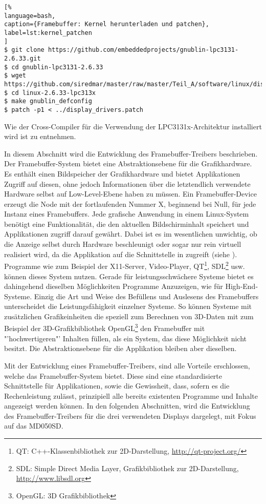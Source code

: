 \begin{lstlisting}[%
language=bash,
caption={Framebuffer: Kernel herunterladen und patchen},
label=lst:kernel_patchen
]
$ git clone https://github.com/embeddedprojects/gnublin-lpc3131-2.6.33.git
$ cd gnublin-lpc3131-2.6.33
$ wget https://github.com/siredmar/master/raw/master/Teil_A/software/linux/display_drivers.patch
$ cd linux-2.6.33-lpc313x
$ make gnublin_defconfig
$ patch -p1 < ../display_drivers.patch
\end{lstlisting}
Wie der Cross-Compiler für die Verwendung der LPC3131x-Architektur installiert wird ist \cite{GnublinWiki2013c} zu entnehmen.

In diesem Abschnitt wird die Entwicklung des Framebuffer-Treibers beschrieben. Der Framebuffer-System bietet eine Abstraktionsebene für die Grafikhardware. Es enthält einen Bildspeicher der Grafikhardware und bietet Applikationen Zugriff auf diesen, ohne jedoch Informationen über die letztendlich verwendete Hardware selbst auf Low-Level-Ebene haben zu müssen. Ein Framebuffer-Device erzeugt die Node  mit der fortlaufenden Nummer X, beginnend bei Null, für jede Instanz eines Framebuffers. Jede grafische Anwendung in einem Linux-System benötigt eine Funktionalität, die den aktuellen Bildschirminhalt speichert und  Applikationen zugriff darauf gewährt. Dabei ist es im wesentlichen unwichtig, ob die Anzeige selbst durch Hardware beschleunigt oder sogar nur rein virtuell realisiert wird, da die Applikation auf die Schnittstelle in  zugreift (siehe  \cite{LinuxKernelFB}).
Programme wie zum Beispiel der X11-Server, Video-Player, QT\footnote{QT: C++-Klassenbibliothek zur 2D-Darstellung, \url{http://qt-project.org/}}, SDL\footnote{SDL: Simple Direct Media Layer, Grafikbibliothek zur 2D-Darstellung, \url{http://www.libsdl.org}} usw. können dieses System nutzen. Gerade für leistungsschwächere Systeme bietet es dahingehend dieselben Möglichkeiten Programme Anzuzeigen, wie für High-End-Systeme. Einzig die Art und Weise des Befüllens und Auslesens des Framebuffers unterscheidet die Leistungsfähigkeit einzelner Systeme. So können Systeme mit zusätzlichen Grafikeinheiten die speziell zum Berechnen von 3D-Daten mit zum Beispiel der 3D-Grafikbibliothek OpenGL\footnote{OpenGL: 3D Grafikbibliothek} den Framebuffer mit "'hochwertigeren"' Inhalten füllen, als ein System, das diese Möglichkeit nicht besitzt. Die Abstraktionsebene für die Applikation bleiben aber dieselben. 

Mit der Entwicklung eines Framebuffer-Treibers, sind alle Vorteile erschlossen, welche das Framebuffer-System bietet. Diese sind eine standardisierte Schnittstelle für Applikationen, sowie die Gewissheit, dass, sofern es die Rechenleistung zulässt, prinzipiell alle bereits existenten Programme und Inhalte angezeigt werden können.
In den folgenden Abschnitten, wird die Entwicklung des Framebuffer-Treibers für die drei verwendeten Displays dargelegt, mit Fokus auf das MD050SD. 
